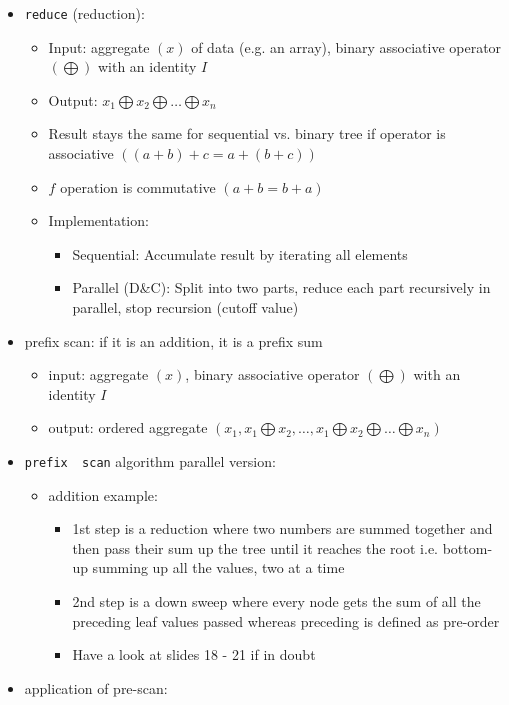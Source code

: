 \documentclass[a4paper]{article}
\newcommand{\inline}[1]{\lstinline!#1!}%
\begin{document}
\begin{itemize}
\begin{itemize}
\item \inline{reduce} (reduction): 
\begin{itemize}
\item Input: aggregate $(x)$ of data (e.g. an array), binary associative operator $(\bigoplus)$ with an identity $I$
\item Output: $x_1\bigoplus x_2\bigoplus\dots\bigoplus x_n$
\item Result stays the same for sequential vs. binary tree if operator is associative $((a+b)+c=a+(b+c))$
\item $f$ operation is commutative $(a+b=b+a)$
\item Implementation:
\begin{itemize}
\item Sequential: Accumulate result by iterating all elements
\item Parallel (D\&C): Split into two parts, reduce each part recursively in parallel, stop recursion (cutoff value)
\end{itemize}
\end{itemize}
\item prefix scan: if it is an addition, it is a prefix sum
\begin{itemize}
\item input: aggregate $(x)$, binary associative operator $(\bigoplus)$ with an identity $I$
\item output: ordered aggregate $(x_1,x_1 \bigoplus x_2,\dots ,x_1 \bigoplus x_2\bigoplus\dots\bigoplus x_n)$
\end{itemize}
\item \inline{prefix  scan} algorithm parallel version: 
\begin{itemize}
\item addition example: 
\begin{itemize}
\item 1st step is a reduction where two numbers are summed together and then pass their sum up the tree until it reaches the root i.e. bottom-up summing up all the values, two at a time
\item 2nd step is a down sweep where every node gets the sum of all the preceding leaf values passed whereas preceding is defined as pre-order 
\item Have a look at slides 18 - 21 if in doubt
\end{itemize}
\end{itemize}
\item application of pre-scan: 
\begin{itemize}

\end{itemize}
\end{itemize}
\end{itemize}
\end{document}
